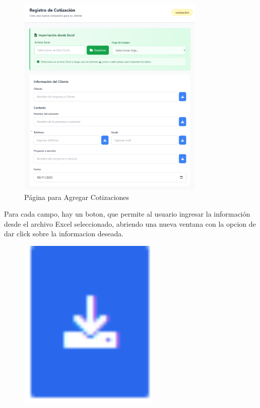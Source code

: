\documentclass{Pretexto/bluereport}
\begin{document}
\begin{minipage}
\begin{figure}[H]
    \centering
    \includegraphics[width=0.8\textwidth]{img/agregar_cotizacion_pagina.png}
    \caption{Página para Agregar Cotizaciones}
    \label{fig:agregar_cotizacion_pagina}
\end{figure}

\begin{minipage}{0.68\linewidth}
    Para cada campo, hay un boton, que permite al usuario ingresar la información desde el archivo Excel seleccionado, 
    abriendo una nueva ventana con la opcion de dar click sobre la informacion deseada.
\end{minipage}
\hfil   
\begin{minipage}{0.18\linewidth}
    \begin{figure}[H]
        \centering
        \includegraphics[width=0.6\textwidth]{img/boton_importacion.png}
        \caption{}
        \label{fig:importar_datos}
    \end{figure}
\end{minipage}



\end{minipage}
\end{document}
